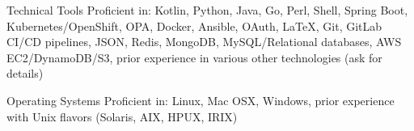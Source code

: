 


\begin{cvskills}


\cvskill
{Technical Tools} %
{Proficient in: Kotlin, Python, Java, Go, Perl, Shell, Spring Boot, Kubernetes/OpenShift, OPA, Docker, Ansible, OAuth, LaTeX, Git, GitLab CI/CD pipelines, JSON, Redis, MongoDB, MySQL/Relational databases, AWS EC2/DynamoDB/S3, prior experience in various other technologies (ask for details)} %





\cvskill
{Operating Systems} %
{Proficient in: Linux, Mac OSX, Windows, prior experience with Unix flavors (Solaris, AIX, HPUX, IRIX)} %




\end{cvskills}
